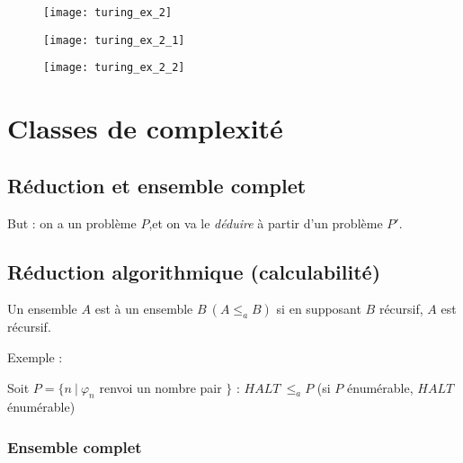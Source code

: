 \begin{minipage}{0.49\textwidth}
	\begin{figure}[H]
		\centering
		\texttt{[image: turing\_ex\_2]}
	\end{figure}
\end{minipage}
\begin{minipage}{0.49\textwidth}
	\begin{figure}[H]
		\centering
		\texttt{[image: turing\_ex\_2\_1]}
	\end{figure}
	\begin{figure}[H]
		\centering
		\texttt{[image: turing\_ex\_2\_2]}
	\end{figure}
\end{minipage}

\chapter{Classes de complexité}

\section{Réduction et ensemble complet}

But : on a un problème $P$,et on va le \textit{déduire} à partir d'un problème $P'$.

\section{Réduction algorithmique (calculabilité)}

Un ensemble $A$ est  à un ensemble $B \ (A \leq_a B)$ si en supposant $B$ récursif, $A$ est récursif.

Exemple :

Soit $P = \{n \ | \ \varphi_n$ renvoi un nombre pair $\}$ : $HALT \ \leq_a P$ (si $P$ énumérable, $HALT$ énumérable)

\subsection{Ensemble complet}

